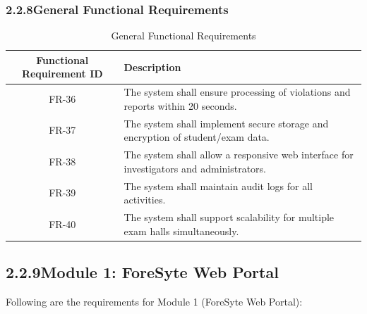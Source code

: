\subsubsection*{2.2.8\quad General Functional Requirements}
\vspace{-0.5em}
\begin{table}[H]
\caption{General Functional Requirements}
\centering
\begin{tabular}{|c|p{11cm}|}
\hline
\textbf{Functional Requirement ID} & \textbf{Description} \\ \hline
FR-36 & The system shall ensure processing of violations and reports within 20 seconds. \\ \hline
FR-37 & The system shall implement secure storage and encryption of student/exam data. \\ \hline
FR-38 & The system shall allow a responsive web interface for investigators and administrators. \\ \hline
FR-39 & The system shall maintain audit logs for all activities. \\ \hline
FR-40 & The system shall support scalability for multiple exam halls simultaneously. \\ \hline
\end{tabular}
\end{table}
\subsection*{2.2.9\quad Module 1: ForeSyte Web Portal}
Following are the requirements for Module 1 (ForeSyte Web Portal):

